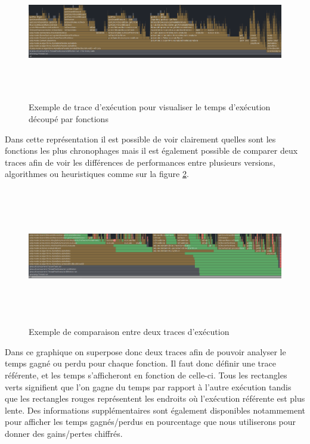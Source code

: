 \documentclass{article}
\begin{document}
\begin{figure}[h]
    \centering
    \includegraphics[width=\textwidth,height=6.0cm,keepaspectratio]{trace_example.png}
    \caption{Exemple de trace d'exécution pour visualiser le temps d'exécution découpé par fonctions}
    \label{trace_ex}
\end{figure}
\FloatBarrier

Dans cette représentation il est possible de voir clairement quelles sont les fonctions les plus chronophages mais il est également possible 
de comparer deux traces afin de voir les différences de performances entre plusieurs versions, algorithmes ou heuristiques comme sur la figure \ref{trace_ex2}.

\begin{figure}[h]
    \centering
    \includegraphics[width=\textwidth,height=6.0cm,keepaspectratio]{trace_ex2.png}
    \caption{Exemple de comparaison entre deux traces d'exécution}
    \label{trace_ex2}
\end{figure}
\FloatBarrier

Dans ce graphique on superpose donc deux traces afin de pouvoir analyser le temps gagné ou perdu pour chaque fonction. Il faut donc définir une trace référente, et les temps
s'afficheront en fonction de celle-ci. Tous les rectangles verts signifient que l'on gagne du temps par rapport à l'autre exécution tandis que les rectangles rouges représentent
les endroits où l'exécution référente est plus lente. Des informations supplémentaires sont également disponibles notammement pour afficher les temps gagnés/perdus en pourcentage
que nous utiliserons pour donner des gains/pertes chiffrés.
\end{document}
